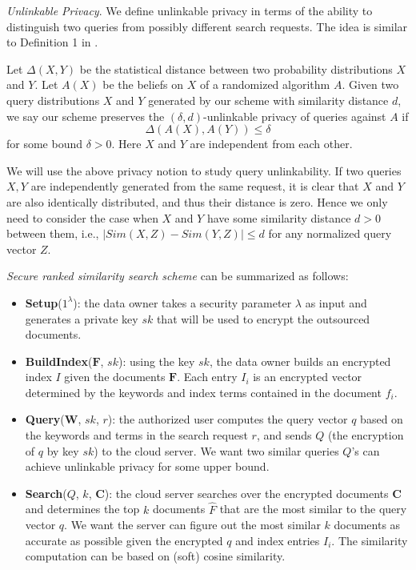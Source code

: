 \documentclass{IEEEtran}
\begin{document}
\emph{Unlinkable Privacy}. We define unlinkable privacy in terms of the ability to distinguish two queries from possibly different search requests. The idea is similar to Definition 1 in \cite{K09}.
\begin{definition}
Let $\Delta(X, Y)$ be the statistical distance between two probability distributions $X$ and $Y$. Let $A(X)$ be the beliefs on $X$ of a randomized algorithm $A$. Given two query distributions $X$ and $Y$ generated by our scheme with similarity distance $d$, we say our scheme preserves the $(\delta, d)$-unlinkable privacy of queries against $A$ if
$$\Delta(A(X), A(Y)) \leq \delta$$
for some bound $\delta > 0$. Here $X$ and $Y$ are independent from each other.
\end{definition}
We will use the above privacy notion to study query unlinkability. 
If two queries $X, Y$ are independently generated from the same request, it is clear that $X$ and $Y$ are also identically distributed, and thus their distance is zero. Hence we only need to consider the case when $X$ and $Y$ have some similarity distance $d>0$ between them, i.e., $|Sim(X, Z) - Sim(Y,Z)| \leq d$ for any normalized query vector $Z$.

\emph{Secure ranked similarity search scheme} can be summarized as follows:
\begin{itemize}
\item \textbf{Setup}($1^\lambda$): the data owner takes a security parameter $\lambda$ as input and generates a private key $sk$ that will be used to encrypt the outsourced documents.
\item \textbf{BuildIndex}($\mathbf{F}$, $sk$): using the key $sk$, the data owner builds an encrypted index $I$ given the documents $\mathbf{F}$. Each entry $I_i$ is an encrypted vector determined by the keywords and index terms contained in the document $f_i$.
\item \textbf{Query}($\mathbf{W}$, $sk$, $r$): the authorized user computes the query vector $q$ based on the keywords and terms in the search request $r$, and sends $Q$ (the encryption of $q$ by key $sk$) to the cloud server. We want two similar queries $Q$'s can achieve unlinkable privacy for some upper bound.
\item \textbf{Search}($Q$, $k$, $\mathbf{C}$): the cloud server searches over the encrypted documents $\mathbf{C}$ and determines the top $k$ documents $\hat{F}$ that are the most similar to the query vector $q$. We want the server can figure out the most similar $k$ documents as accurate as possible given the encrypted $q$ and index entries $I_i$. The similarity computation can be based on (soft) cosine similarity.
\end{itemize}
\end{document}
